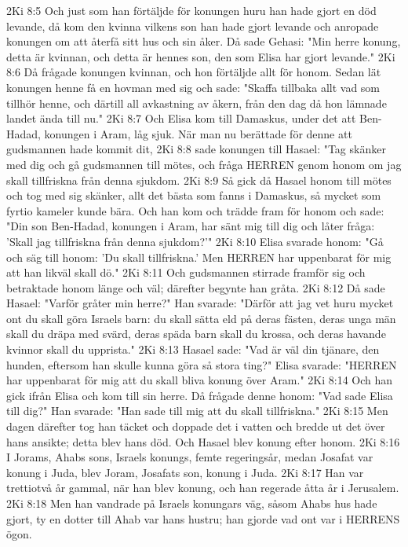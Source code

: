 2Ki 8:5  Och just som han förtäljde för konungen huru han hade gjort en död levande, då kom den kvinna vilkens son han hade gjort levande och anropade konungen om att återfå sitt hus och sin åker. Då sade Gehasi: "Min herre konung, detta är kvinnan, och detta är hennes son, den som Elisa har gjort levande."
2Ki 8:6  Då frågade konungen kvinnan, och hon förtäljde allt för honom. Sedan lät konungen henne få en hovman med sig och sade: "Skaffa tillbaka allt vad som tillhör henne, och därtill all avkastning av åkern, från den dag då hon lämnade landet ända till nu."
2Ki 8:7  Och Elisa kom till Damaskus, under det att Ben-Hadad, konungen i Aram, låg sjuk. När man nu berättade för denne att gudsmannen hade kommit dit,
2Ki 8:8  sade konungen till Hasael: "Tag skänker med dig och gå gudsmannen till mötes, och fråga HERREN genom honom om jag skall tillfriskna från denna sjukdom.
2Ki 8:9  Så gick då Hasael honom till mötes och tog med sig skänker, allt det bästa som fanns i Damaskus, så mycket som fyrtio kameler kunde bära. Och han kom och trädde fram för honom och sade: "Din son Ben-Hadad, konungen i Aram, har sänt mig till dig och låter fråga: 'Skall jag tillfriskna från denna sjukdom?'"
2Ki 8:10  Elisa svarade honom: "Gå och säg till honom: 'Du skall tillfriskna.' Men HERREN har uppenbarat för mig att han likväl skall dö."
2Ki 8:11  Och gudsmannen stirrade framför sig och betraktade honom länge och väl; därefter begynte han gråta.
2Ki 8:12  Då sade Hasael: "Varför gråter min herre?" Han svarade: "Därför att jag vet huru mycket ont du skall göra Israels barn: du skall sätta eld på deras fästen, deras unga män skall du dräpa med svärd, deras späda barn skall du krossa, och deras havande kvinnor skall du upprista."
2Ki 8:13  Hasael sade: "Vad är väl din tjänare, den hunden, eftersom han skulle kunna göra så stora ting?" Elisa svarade: "HERREN har uppenbarat för mig att du skall bliva konung över Aram."
2Ki 8:14  Och han gick ifrån Elisa och kom till sin herre. Då frågade denne honom: "Vad sade Elisa till dig?" Han svarade: "Han sade till mig att du skall tillfriskna."
2Ki 8:15  Men dagen därefter tog han täcket och doppade det i vatten och bredde ut det över hans ansikte; detta blev hans död. Och Hasael blev konung efter honom.
2Ki 8:16  I Jorams, Ahabs sons, Israels konungs, femte regeringsår, medan Josafat var konung i Juda, blev Joram, Josafats son, konung i Juda.
2Ki 8:17  Han var trettiotvå år gammal, när han blev konung, och han regerade åtta år i Jerusalem.
2Ki 8:18  Men han vandrade på Israels konungars väg, såsom Ahabs hus hade gjort, ty en dotter till Ahab var hans hustru; han gjorde vad ont var i HERRENS ögon.
